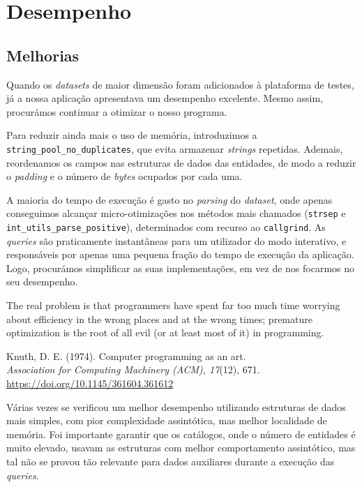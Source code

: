 \documentclass[11pt, a4paper]{article}
\begin{document}
\section{Desempenho}
\label{sec:performance}

\subsection{Melhorias}
\label{sec:performance-improvements}

Quando os \emph{datasets} de maior dimensão foram adicionados à plataforma de testes, já a nossa
aplicação apresentava um desempenho excelente. Mesmo assim, procurámos continuar a otimizar o nosso
programa.

Para reduzir ainda mais o uso de memória, introduzimos a \texttt{string\_pool\_no\_duplicates}, que
evita armazenar \emph{strings} repetidas. Ademais, reordenamos os campos nas estruturas de dados das
entidades, de modo a reduzir o \emph{padding} e o número de \emph{bytes} ocupados por cada uma.

A maioria do tempo de execução é gasto no \emph{parsing} do \emph{dataset}, onde apenas conseguimos
alcançar micro-otimizações nos métodos mais chamados (\texttt{strsep} e
\texttt{int\_utils\_parse\_positive}), determinados com recurso ao \texttt{callgrind}. As
\emph{queries} são praticamente instantâneas para um utilizador do modo interativo, e responsáveis
por apenas uma pequena fração do tempo de execução da aplicação. Logo, procurámos simplificar
as suas implementações, em vez de nos focarmos no seu desempenho.

\hspace{1cm}\parbox{15cm}{\small
    The real problem is that programmers have spent far too much time worrying about efficiency in
    the wrong places and at the wrong times; premature optimization is the root of all evil (or at
    least most of it) in programming.

    \begin{flushright}
        Knuth, D. E. (1974). Computer programming as an art. \\
        \emph{Association for Computing Machinery (ACM), 17}(12), 671. \\
        \url{https://doi.org/10.1145/361604.361612}
    \end{flushright}
}

Várias vezes se verificou um melhor desempenho utilizando estruturas de dados mais simples, com pior
complexidade assintótica, mas melhor localidade de memória. Foi importante garantir que os
catálogos, onde o número de entidades é muito elevado, usavam as estruturas com melhor comportamento
assintótico, mas tal não se provou tão relevante para dados auxiliares durante a execução das
\emph{queries}.
\end{document}
